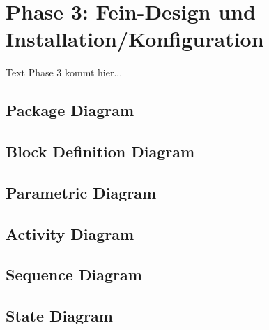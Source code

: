 \chapter{Phase 3: Fein-Design und Installation/Konfiguration}

Text Phase 3 kommt hier...


\section{Package Diagram}

\section{Block Definition Diagram}

\section{Parametric Diagram}

\section{Activity Diagram}

\section{Sequence Diagram}

\section{State Diagram}
